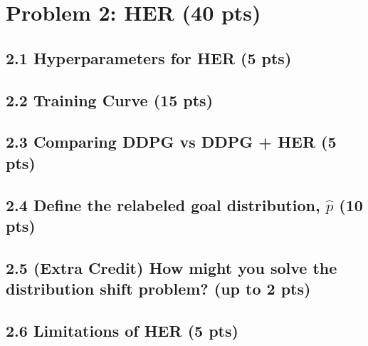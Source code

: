 \documentclass[12pt]{article}
\begin{document}
\newpage
\section*{Problem 2: HER (40 pts)}

\subsection*{2.1 Hyperparameters for HER (5 pts)}
\begin{solution}[height=5cm]
\end{solution}

\subsection*{2.2 Training Curve (15 pts)}
\begin{solution}[height=13cm]
\end{solution}

\subsection*{2.3 Comparing DDPG vs DDPG + HER (5 pts)}
\begin{solution}[height=10cm]
\end{solution}

\subsection*{2.4 Define the relabeled goal distribution, $\hat{p}$ (10 pts)}
\begin{solution}[height=9cm]
\end{solution}

\subsection*{2.5 (Extra Credit) How might you solve the distribution shift problem? (up to 2 pts)}
\begin{solution}[height=8cm]
\end{solution}

\subsection*{2.6 Limitations of HER (5 pts)}
\begin{solution}[height=10cm]
\end{solution}
\end{document}
